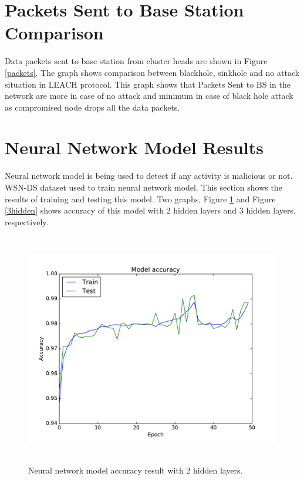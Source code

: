 \section{Packets Sent to Base Station Comparison}
Data packets sent to base station from cluster heads are shown in Figure \ref{packets}. The graph shows comparison between blackhole, sinkhole and no attack situation in LEACH protocol. This graph shows that Packets Sent to BS in the network are more in case of no attack and minimum in case of black hole attack as compromised node drops all the data packets.

\section{Neural Network Model Results}
\label{NNresults}
Neural network model is being used to detect if any activity is malicious or not. WSN-DS dataset used to train neural network model. This section shows the results of training and testing this model. Two graphs, Figure \ref{2hidden} and Figure \ref{3hidden} shows accuracy of this model with 2 hidden layers and 3 hidden layers, respectively.
\begin{figure}[hbp]
    \centering
    \includegraphics[width=5.5in, height=4in] {Figures/PDF/2hidden.pdf}
    \caption{Neural network model accuracy result with 2 hidden layers.}
    \label{2hidden}
\end{figure}

